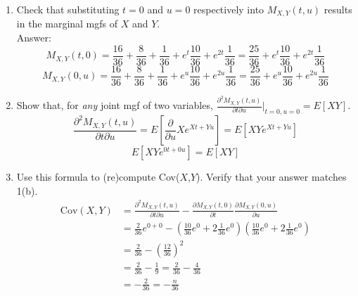 \documentclass{article}
\begin{document}
\begin{enumerate}
\begin{enumerate}
            \item   Check that substituting $t=0$ and $u=0$ respectively into $M_{X,Y}(t,u)$ results in the 
                    marginal mgfs of $X$ and $Y$.
                \\Answer:
                $$M_{X,Y}(t,0)=\frac{16}{36}+\frac{8}{36}+\frac{1}{36}+e^t\frac{10}{36}+e^{2t}\frac{1}{36}=\frac{25}{36}+e^t\frac{10}{36}+e^{2t}\frac{1}{36}$$
                $$M_{X,Y}(0,u)=\frac{16}{36}+\frac{8}{36}+\frac{1}{36}+e^u\frac{10}{36}+e^{2u}\frac{1}{36}=\frac{25}{36}+e^u\frac{10}{36}+e^{2u}\frac{1}{36}$$
            \item   Show that, for \textit{any} joint mgf of two variables, $\frac{\partial^2 M_{X,Y}(t,u)}{\partial t \partial u}
                    \Big|_{t=0,u=0} = E[XY]$.
                $$\frac{\partial^2 M_{X,Y}(t,u)}{\partial t\partial u} = E[\frac{\partial}{\partial u} Xe^{Xt+Yu}]= E[XYe^{Xt+Yu}]$$
                $$E[XYe^{0t+0u}] = E[XY]$$
            \clearpage
            \item   Use this formula to (re)compute Cov($X$,$Y$). Verify that your answer matches 1(b).
                \begin{align*}
                    \text{Cov}(X,Y)&=\frac{\partial^2 M_{X,Y}(t,u)}{\partial t\partial u}-\frac{\partial M_{X,Y}(t,0)}{\partial t}\frac{\partial M_{X,Y}(0,u)}{\partial u}\\
                                   &= \frac{2}{36}e^{0+0} - \left(\frac{10}{36}e^0 + 2\frac{1}{36}e^0\right)\left(\frac{10}{36}e^0 + 2\frac{1}{36}e^0\right) \\
                                   &= \frac{2}{36} - \left(\frac{12}{36}\right)^2 \\
                                   &= \frac{2}{36} - \frac{1}{9} = \frac{2}{36} - \frac{4}{36} \\
                                   &= -\frac{2}{36} = -\frac{n}{36}
                \end{align*}
        \end{enumerate}
\end{enumerate}
\end{document}
